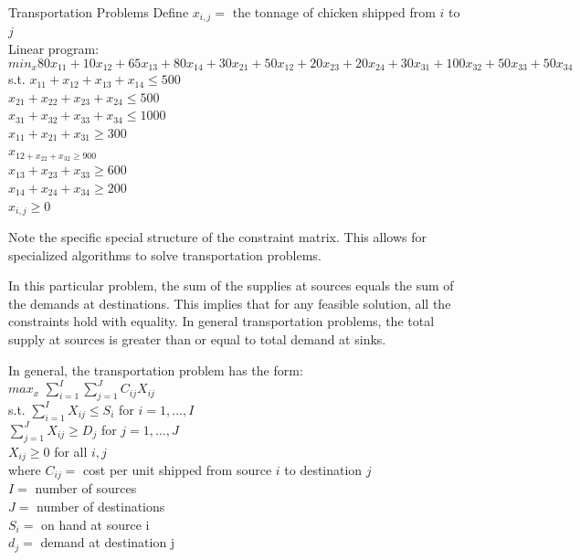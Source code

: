 \documentclass{article}
\begin{document}
\begin{eg}{Transportation Problems}
    Define \(x_{i,j}=\) the tonnage of chicken shipped from \(i\) to \(j\)\\
    Linear program: \\
    \[
      min_{x} 80x_{11}+10x_{12}+65x_{13}+80x_{14}+30x_{21}+50x_{12}+20x_{23}+20x_{24}+30x_{31}+100x_{32}+50x_{33}+50x_{34}     
    \]
    s.t. \(x_{11}+x_{12}+x_{13}+x_{14}\leq500\)\\
    \(x_{21}+x_{22}+x_{23}+x_{24}\leq500\)\\
    \(x_{31}+x_{32}+x_{33}+x_{34}\leq1000\)\\
    \(x_{11}+x_{21}+x_{31}\geq300\)\\
    \(x_{12+x_{22}+x_{32}\geq900}\)\\
    \(x_{13}+x_{23}+x_{33}\geq600\)\\
    \(x_{14}+x_{24}+x_{34}\geq200\)\\  
    \(x_{i,j}\geq0\) 
    \begin{remark}
        Note the specific special structure of the constraint matrix. This allows
        for specialized algorithms to solve transportation problems.
    \end{remark}
    \begin{remark}
        In this particular problem, the sum of the supplies at sources equals the 
        sum of the demands at destinations. This implies that for any feasible solution, 
        all the constraints hold with equality. In general transportation problems, 
        the total supply at sources is greater than or equal to total demand at sinks.
    \end{remark}
    \begin{remark}
        In general, the transportation problem has the form: \\
        \(max_{x}\)  \(\sum_{i=1}^{I}\sum_{j=1}^{J}C_{ij}X_{ij}\) \\
        s.t. \(\sum_{i=1}^{I}X_{ij}\leq S_i \) for \(i=1,\dots,I\) \\
        \(\sum_{j=1}^{J}X_{ij}\geq D_j \) for \(j=1,\dots,J\) \\
        \(X_{ij}\geq0\) for all \(i,j\) \\
        where \(C_{ij}=\) cost per unit shipped from source \(i\) to destination \(j\) \\ 
        \(I=\) number of sources \\
        \(J=\) number of destinations \\
        \(S_i=\) on hand at source i \\
        \(d_j=\) demand at destination j    
    \end{remark}
\end{eg}
\end{document}
